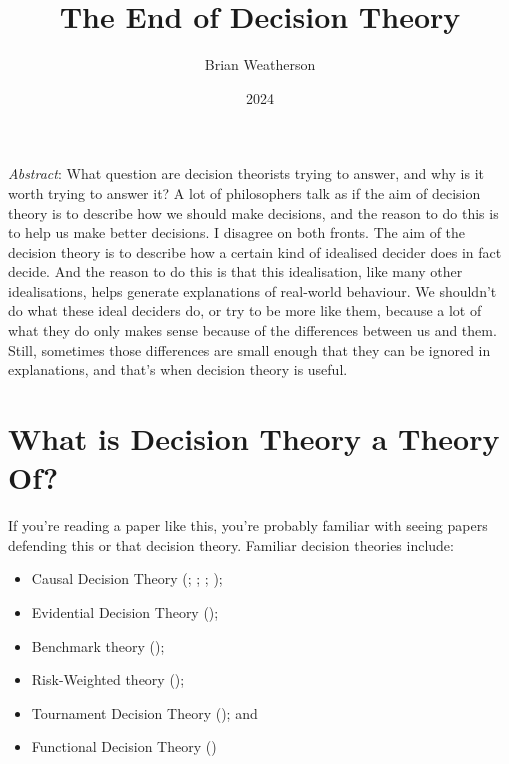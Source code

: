 \documentclass[
  11pt,
  letterpaper,
  DIV=11,
  numbers=noendperiod,
  twoside]{scrartcl}
\title{The End of Decision Theory}
\author{Brian Weatherson}
\date{2024}
\providecommand{\tightlist}{%
  \setlength{\itemsep}{0pt}\setlength{\parskip}{0pt}}
\renewenvironment{abstract}
 {\vspace{-1.25cm}
 \quotation\small\noindent\emph{Abstract}:}
 {\endquotation}
\begin{document}
\maketitle
\begin{abstract}
What question are decision theorists trying to answer, and why is it
worth trying to answer it? A lot of philosophers talk as if the aim of
decision theory is to describe how we should make decisions, and the
reason to do this is to help us make better decisions. I disagree on
both fronts. The aim of the decision theory is to describe how a certain
kind of idealised decider does in fact decide. And the reason to do this
is that this idealisation, like many other idealisations, helps generate
explanations of real-world behaviour. We shouldn't do what these ideal
deciders do, or try to be more like them, because a lot of what they do
only makes sense because of the differences between us and them. Still,
sometimes those differences are small enough that they can be ignored in
explanations, and that's when decision theory is useful.
\end{abstract}


\section{What is Decision Theory a Theory
Of?}\label{what-is-decision-theory-a-theory-of}

If you're reading a paper like this, you're probably familiar with
seeing papers defending this or that decision theory. Familiar decision
theories include:

\begin{itemize}
\tightlist
\item
  Causal Decision Theory (; ;
  ; );
\item
  Evidential Decision Theory ();
\item
  Benchmark theory ();
\item
  Risk-Weighted theory ();
\item
  Tournament Decision Theory (); and
\item
  Functional Decision Theory
  ()
\end{itemize}
\end{document}
